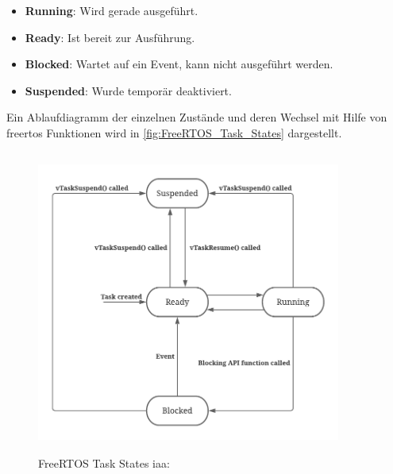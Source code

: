\documentclass[../EDF Master Thesis.tex]{subfiles}
\begin{document}
\begin{itemize}
    \item \textbf{Running}: Wird gerade ausgeführt.
    \item \textbf{Ready}: Ist bereit zur Ausführung.
    \item \textbf{Blocked}: Wartet auf ein Event, kann nicht ausgeführt werden.
    \item \textbf{Suspended}: Wurde temporär deaktiviert.
\end{itemize}

Ein Ablaufdiagramm der einzelnen Zustände und deren Wechsel mit Hilfe von \ac{freertos} Funktionen wird in \autoref{fig:FreeRTOS_Task_States} dargestellt.

\begin{figure}[H]
    \centering
    \includegraphics[height=10cm, width=10cm]{./attachments/FreeRTOS_Task_States.pdf}
    \caption{FreeRTOS Task States \ac{iaa}: \parencite{freertos-task-states}}
    \label{fig:FreeRTOS_Task_States}
\end{figure}
\end{document}
